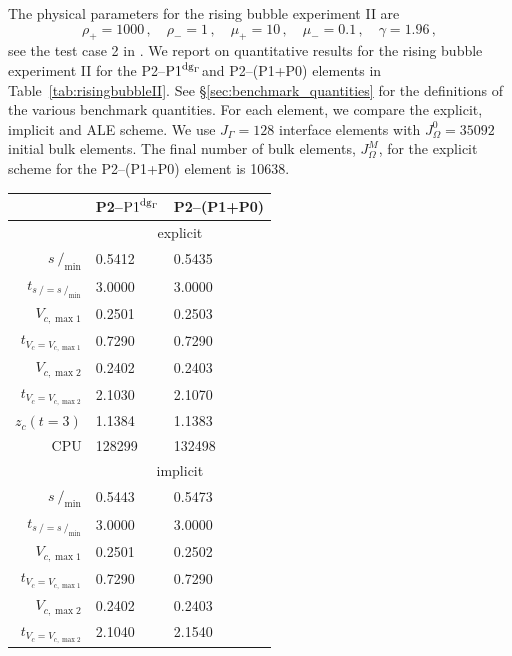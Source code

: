 \documentclass[a4paper,12pt,onecolumn]{article}
\newcommand{\pdg}{${\rm P1}^{{\rm dg}_\Gamma}$} %
\newcommand{\strikes}{\mbox{$s\!\!\!\!\:/$}}
\begin{document}
The physical parameters for the rising bubble experiment II are
\begin{equation} \label{eq:Hysing2}
\rho_+ = 1000\,,\quad \rho_- = 1\,,\quad \mu_+ = 10\,,\quad \mu_- = 0.1\,,\quad
\gamma = 1.96\,,
\end{equation}
see the test case 2 in \cite[Table~I]{HysingTKPBGT09}. We report on
quantitative results for the rising bubble experiment II for the P2--\pdg and
P2--(P1+P0) elements in Table~\ref{tab:risingbubbleII}. See
\S\ref{sec:benchmark_quantities} for the definitions of the various benchmark
quantities. For each element, we compare the explicit, implicit and ALE scheme.
We use $J_\Gamma=128$ interface elements with $J_\Omega^0=35092$ initial bulk
elements. The final number of bulk elements, $J_\Omega^M$, for the explicit
scheme for the P2--(P1+P0) element is 10638.
\begin{table}
\center
\hspace*{-3.25cm}
\begin{tabular}{rll}
\hline
 & P2--\pdg & P2--(P1+P0) \\
\hline
& \multicolumn{2}{c}{explicit} \\
\cmidrule{2-3}
$\strikes_{\min}$                & 0.5412 & 0.5435 \\
$t_{\strikes = \strikes_{\min}}$ & 3.0000 & 3.0000 \\
$V_{c,\max 1}$                   & 0.2501 & 0.2503 \\
$t_{V_c = V_{c,\max 1}}$         & 0.7290 & 0.7290 \\
$V_{c,\max 2}$                   & 0.2402 & 0.2403 \\
$t_{V_c = V_{c,\max 2}}$         & 2.1030 & 2.1070 \\
$z_c(t=3)$                       & 1.1384 & 1.1383 \\
CPU                              & 128299 & 132498 \\
\cmidrule{2-3}
& \multicolumn{2}{c}{implicit} \\
\cmidrule{2-3}
$\strikes_{\min}$                & 0.5443 & 0.5473 \\
$t_{\strikes = \strikes_{\min}}$ & 3.0000 & 3.0000 \\
$V_{c,\max 1}$                   & 0.2501 & 0.2502 \\
$t_{V_c = V_{c,\max 1}}$         & 0.7290 & 0.7290 \\
$V_{c,\max 2}$                   & 0.2402 & 0.2403 \\
$t_{V_c = V_{c,\max 2}}$         & 2.1040 & 2.1540 \\

\end{tabular}
\end{table}
\end{document}
